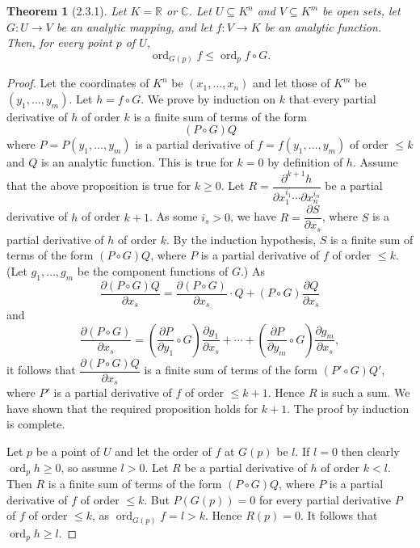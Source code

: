 \documentclass[11pt]{article}
\theoremstyle{plain}
\newtheorem*{theorem*}{Theorem}
\theoremstyle{definition}
\newcommand{\R}{\mathbb{R}}
\newcommand{\C}{\mathbb{C}}
\DeclareMathOperator{\ord}{ord}
\begin{document}
\begin{theorem*}[2.3.1]
Let $K = \R$ or $\C$. Let $U \subseteq K^n$ and $V \subseteq K^m$ be
open sets, let $G: U \to V$ be an analytic mapping, and let
$f: V \to K$ be an analytic function. Then, for every point $p$ of $U$,
\[
\ord_{G(p)} f \le \ord_p f \circ G.
\]
\end{theorem*}

\begin{proof}
Let the coordinates of $K^n$ be $(x_1, \ldots, x_n)$ and let those of
$K^m$ be $(y_1, \ldots, y_m)$. Let $h = f \circ G$. We prove by induction
on $k$ that every partial derivative of $h$ of order $k$ is a finite sum
of terms of the form
\[
(P \circ G) Q
\]
where $P = P(y_1, \ldots, y_m)$ is a partial derivative of
$f = f(y_1, \ldots, y_m)$ of order $\le k$ and $Q$ is an analytic
function. This is true for $k = 0$ by definition of $h$. Assume that the
above proposition is true for $k \ge 0$. Let
$R = \dfrac{\partial^{k+1} h}{\partial x_1^{i_1} \cdots \partial x_n^{i_n}}$
be a partial derivative of $h$ of order $k+1$. As some $i_s > 0$, we
have $R = \dfrac{\partial S}{\partial x_s}$, where $S$ is a partial
derivative of $h$ of order $k$. By the induction hypothesis, $S$ is a
finite sum of terms of the form $(P \circ G) Q$, where $P$ is a partial
derivative of $f$ of order $\le k$. (Let $g_1, \ldots, g_m$ be the
component functions of $G$.) As
\[
\frac{\partial (P \circ G) Q}{\partial x_s}
= \frac{\partial (P \circ G)}{\partial x_s} \cdot Q
+ (P \circ G) \frac{\partial Q}{\partial x_s}
\]
and
\[
\frac{\partial (P \circ G)}{\partial x_s}
= \left( \frac{\partial P}{\partial y_1} \circ G \right)
\frac{\partial g_1}{\partial x_s} + \cdots
+ \left( \frac{\partial P}{\partial y_m} \circ G \right)
\frac{\partial g_m}{\partial x_s},
\]
it follows that $\dfrac{\partial (P \circ G) Q}{\partial x_s}$ is a
finite sum of terms of the form $(P' \circ G) Q'$, where $P'$ is a
partial derivative of $f$ of order $\le k + 1$. Hence $R$ is such a
sum. We have shown that the required proposition holds for $k + 1$.
The proof by induction is complete.

Let $p$ be a point of $U$ and let the order of $f$ at $G(p)$ be $l$. If
$l = 0$ then clearly $\ord_p h \ge 0$, so assume $l > 0$. Let $R$ be a
partial derivative of $h$ of order $k < l$. Then $R$ is a finite sum of
terms of the form $(P \circ G) Q$, where $P$ is a partial derivative of
$f$ of order $\le k$. But $P(G(p)) = 0$ for every partial derivative
$P$ of $f$ of order $\le k$, as $\ord_{G(p)} f = l > k$. Hence
$R(p) = 0$. It follows that $\ord_p h \ge l$.
\end{proof}
\end{document}
